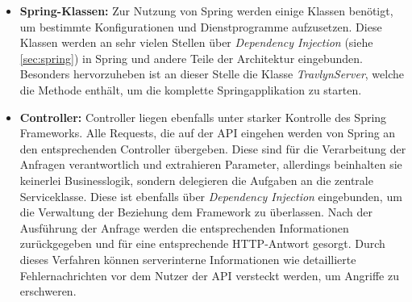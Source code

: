 	\begin{itemize}
		\item \textbf{Spring-Klassen:} Zur Nutzung von Spring werden einige Klassen benötigt, um bestimmte Konfigurationen und Dienstprogramme aufzusetzen. Diese Klassen werden an sehr vielen Stellen über \textit{Dependency Injection} (siehe \autoref{sec:spring}) in Spring und andere Teile der Architektur eingebunden. Besonders hervorzuheben ist an dieser Stelle die Klasse \textit{TravlynServer}, welche die Methode enthält, um die komplette Springapplikation zu starten.
		\item \textbf{Controller:} Controller liegen ebenfalls unter starker Kontrolle des Spring Frameworks. Alle Requests, die auf der API eingehen werden von Spring an den entsprechenden Controller übergeben. Diese sind für die Verarbeitung der Anfragen verantwortlich und extrahieren Parameter, allerdings beinhalten sie keinerlei Businesslogik, sondern delegieren die Aufgaben an die zentrale Serviceklasse. Diese ist ebenfalls über \textit{Dependency Injection} eingebunden, um die Verwaltung der Beziehung dem Framework zu überlassen. Nach der Ausführung der Anfrage werden die entsprechenden Informationen zurückgegeben und für eine entsprechende \acs{HTTP}-Antwort gesorgt. Durch dieses Verfahren können serverinterne Informationen wie detaillierte Fehlernachrichten vor dem Nutzer der API versteckt werden, um Angriffe zu erschweren.
		

\end{itemize}
